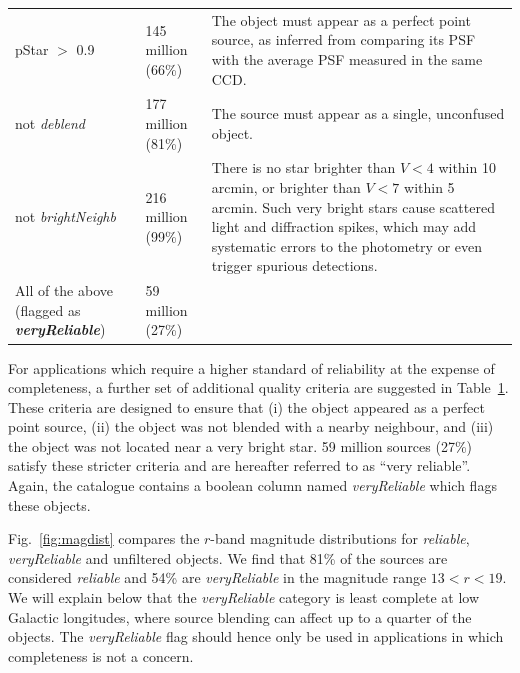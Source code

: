 \documentclass[useAMS,usenatbib]{mn2e}
\begin{document}
\begin{table}
\begin{tabular}{p{8cm}lp{6cm}}
   pStar $>$ 0.9 &
   145 million (66\%) &
   The object must appear as a perfect point source,
   as inferred from comparing its PSF
   with the average PSF measured in the same CCD. \\
   
   {\sc not} \emph{deblend} &
   177 million (81\%) &
   The source must appear as a single, unconfused object. \\
   
   {\sc not} \emph{brightNeighb} &
   216 million (99\%) &
   There is no star brighter than $V < 4$ within 10 arcmin, 
   or brighter than $V < 7$ within 5 arcmin.
   Such very bright stars cause scattered light and diffraction spikes,
   which may add systematic errors to the photometry
   or even trigger spurious detections. \\  
  \hline
  
  All of the above (flagged as {\bf\emph{veryReliable}}) &
  59 million (27\%) & \\
  \hline
\end{tabular}

\label{tab:veryreliable}

\vspace{1cm}
\end{table}

For applications which require
a higher standard of reliability at the expense of completeness,
a further set of additional quality criteria
are suggested in Table~\ref{tab:veryreliable}.
These criteria are designed to ensure that
(i) the object appeared as a perfect point source,
(ii) the object was not blended with a nearby neighbour,
and (iii) the object was not located near a very bright star.
59 million sources (27\%) satisfy
these stricter criteria 
and are hereafter referred to as ``very reliable''.
Again, the catalogue contains a boolean column
named \emph{veryReliable} which flags these objects.

Fig.~\ref{fig:magdist} compares the $r$-band magnitude
distributions for \emph{reliable}, \emph{veryReliable}
and unfiltered objects.
We find that 81\% of the sources 
are considered \emph{reliable}
and 54\% are \emph{veryReliable}
in the magnitude range $13 < r < 19$.
We will explain below that the
\emph{veryReliable} category is least complete
at low Galactic longitudes,
where source blending can affect
up to a quarter of the objects.
The \emph{veryReliable} flag should hence
only be used in applications in which 
completeness is not a concern.
\end{document}
